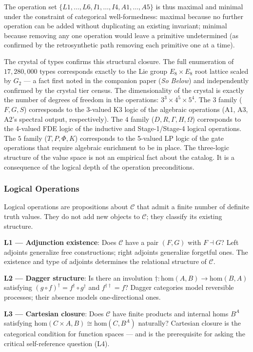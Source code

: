 \documentclass[12pt,a4paper]{article}
\begin{document}
The operation set $\{L1,\dots,L6, I1,\dots,I4, A1,\dots,A5\}$ is thus maximal and minimal under the constraint of categorical well-formedness: maximal because no further operation can be added without duplicating an existing invariant; minimal because removing any one operation would leave a primitive undetermined (as confirmed by the retrosynthetic path removing each primitive one at a time).

The crystal of types confirms this structural closure. The full enumeration of $17{,}280{,}000$ types corresponds exactly to the Lie group $E_8 \times E_8$ root lattice scaled by $G_2$ --- a fact first noted in the companion paper (\emph{So Below}) and independently confirmed by the crystal tier census. The dimensionality of the crystal is exactly the number of degrees of freedom in the operations: $3^3 \times 4^5 \times 5^4$. The $3$ family ($F,G,S$) corresponds to the 3-valued K3 logic of the algebraic operations (A1, A3, A2's spectral output, respectively). The $4$ family ($D,R,\Gamma,H,\Omega$) corresponds to the 4-valued FDE logic of the inductive and Stage-1/Stage-4 logical operations. The $5$ family ($T,P,\Phi,K$) corresponds to the 5-valued LP logic of the gate operations that require algebraic enrichment to be in place. The three-logic structure of the value space is not an empirical fact about the catalog. It is a consequence of the logical depth of the operation preconditions.

\subsubsection{Logical Operations}

Logical operations are propositions about $\mathcal{C}$ that admit a finite number of definite truth values. They do not add new objects to $\mathcal{C}$; they classify its existing structure.

\textbf{L1 --- Adjunction existence}: Does $\mathcal{C}$ have a pair $(F, G)$ with $F \dashv G$? Left adjoints generalize free constructions; right adjoints generalize forgetful ones. The existence and type of adjoints determines the relational structure of $\mathcal{C}$.

\textbf{L2 --- Dagger structure}: Is there an involution $\dagger: \text{hom}(A,B) \to \text{hom}(B,A)$ satisfying $(g \circ f)^\dagger = f^\dagger \circ g^\dagger$ and $f^{\dagger\dagger} = f$? Dagger categories model reversible processes; their absence models one-directional ones.

\textbf{L3 --- Cartesian closure}: Does $\mathcal{C}$ have finite products and internal homs $B^A$ satisfying $\text{hom}(C \times A, B) \cong \text{hom}(C, B^A)$ naturally? Cartesian closure is the categorical condition for function spaces --- and is the prerequisite for asking the critical self-reference question (L4).
\end{document}
